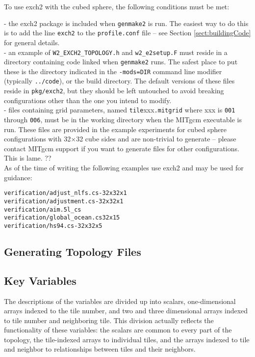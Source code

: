 To use exch2 with the cubed sphere, the following conditions must be met:

- the exch2 package is included when \texttt{genmake2} is run.  The
  easiest way to do this is to add the line \texttt{exch2} to the
  \texttt{profile.conf} file -- see Section \ref{sect:buildingCode}
  for general details. \\

- an example of \texttt{W2\_EXCH2\_TOPOLOGY.h} and
  \texttt{w2\_e2setup.F} must reside in a directory containing code
  linked when \texttt{genmake2} runs.  The safest place to put these
  is the directory indicated in the \texttt{-mods=DIR} command line
  modifier (typically \texttt{../code}), or the build directory.  The
  default versions of these files reside in \texttt{pkg/exch2}, but
  they should be left untouched to avoid breaking configurations other
  than the one you intend to modify.\\

- files containing grid parameters, named
  \texttt{tile}xxx\texttt{.mitgrid} where xxx is \texttt{001} through
  \texttt{006}, must be in the working directory when the MITgcm
  executable is run.  These files are provided in the example
  experiments for cubed sphere configurations with 32$\times$32 cube
  sides and are non-trivial to generate -- please contact MITgcm
  support if you want to generate files for other configurations.
  This is lame. ?? \\

As of the time of writing the following examples use exch2 and may be
used for guidance:

\begin{verbatim}
verification/adjust_nlfs.cs-32x32x1
verification/adjustment.cs-32x32x1 
verification/aim.5l_cs
verification/global_ocean.cs32x15
verification/hs94.cs-32x32x5
\end{verbatim}




\subsection{Generating Topology Files}

\subsection{Key Variables}

The descriptions of the variables are divided up into scalars,
one-dimensional arrays indexed to the tile number, and two and three
dimensional arrays indexed to tile number and neighboring tile.  This
division actually reflects the functionality of these variables: the
scalars are common to every part of the topology, the tile-indexed
arrays to individual tiles, and the arrays indexed to tile and
neighbor to relationships between tiles and their neighbors.

